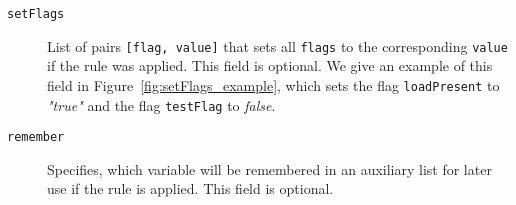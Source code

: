 \begin{description}
    \begin{minipage}{\linewidth}
        
        \label{fig:conditions_example}
      \end{minipage}

    \item[\texttt{setFlags}] List of pairs \texttt{[flag, value]} that sets all
    \texttt{flags} to the corresponding \texttt{value} if the rule was applied.
    This field is optional. We give an example of this field in
    Figure~\ref{fig:setFlags_example}, which sets the flag \texttt{loadPresent}
    to \emph{"true"} and the flag \texttt{testFlag} to \emph{false}.

     \begin{minipage}{\linewidth}
        
        \label{fig:setFlags_example}
      \end{minipage}

    \item[\texttt{remember}] Specifies, which variable will be remembered in an
    auxiliary list for later use if the rule is applied. This field is optional.
\end{description}

\medskip

